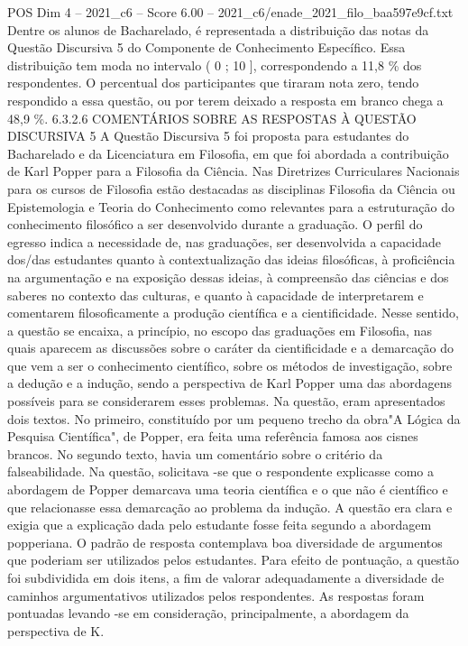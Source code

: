 \begin{textsample}{POS Dim 4 – 2021\_c6 – Score 6.00 – 2021\_c6/enade\_2021\_filo\_baa597e9cf.txt}
Dentre os alunos de Bacharelado, é representada a distribuição das notas da Questão Discursiva 5 do Componente de Conhecimento Específico.
Essa distribuição tem moda no intervalo ( 0 ; 10 ], correspondendo a 11,8 \% dos respondentes.
O percentual dos participantes que tiraram nota zero, tendo respondido a essa questão, ou por terem deixado a resposta em branco chega a 48,9 \%. 6.3.2.6 COMENTÁRIOS SOBRE AS RESPOSTAS À QUESTÃO DISCURSIVA 5 A Questão Discursiva 5 foi proposta para estudantes do Bacharelado e da Licenciatura em Filosofia, em que foi abordada a contribuição de Karl Popper para a Filosofia da Ciência.
Nas Diretrizes Curriculares Nacionais para os cursos de Filosofia estão destacadas as disciplinas Filosofia da Ciência ou Epistemologia e Teoria do Conhecimento como relevantes para a estruturação do conhecimento filosófico a ser desenvolvido durante a graduação.
O perfil do egresso indica a necessidade de, nas graduações, ser desenvolvida a capacidade dos/das estudantes quanto à contextualização das ideias filosóficas, à proficiência na argumentação e na exposição dessas ideias, à compreensão das ciências e dos saberes no contexto das culturas, e quanto à capacidade de interpretarem e comentarem filosoficamente a produção científica e a cientificidade.
Nesse sentido, a questão se encaixa, a princípio, no escopo das graduações em Filosofia, nas quais aparecem as discussões sobre o caráter da cientificidade e a demarcação do que vem a ser o conhecimento científico, sobre os métodos de investigação, sobre a dedução e a indução, sendo a perspectiva de Karl Popper uma das abordagens possíveis para se considerarem esses problemas.
Na questão, eram apresentados dois textos.
No primeiro, constituído por um pequeno trecho da obra"A Lógica da Pesquisa Científica", de Popper, era feita uma referência famosa aos cisnes brancos.
No segundo texto, havia um comentário sobre o critério da falseabilidade.
Na questão, solicitava -se que o respondente explicasse como a abordagem de Popper demarcava uma teoria científica e o que não é científico e que relacionasse essa demarcação ao problema da indução.
A questão era clara e exigia que a explicação dada pelo estudante fosse feita segundo a abordagem popperiana.
O padrão de resposta contemplava boa diversidade de argumentos que poderiam ser utilizados pelos estudantes.
Para efeito de pontuação, a questão foi subdividida em dois itens, a fim de valorar adequadamente a diversidade de caminhos argumentativos utilizados pelos respondentes.
As respostas foram pontuadas levando -se em consideração, principalmente, a abordagem da perspectiva de K.

\end{textsample}
